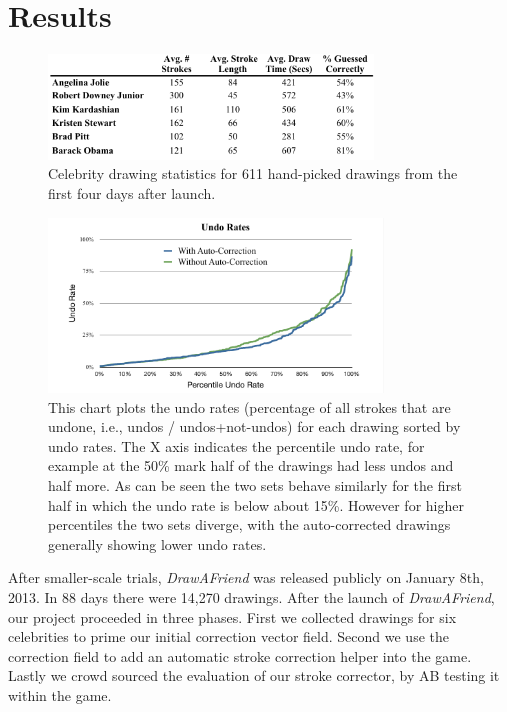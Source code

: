 \section{Results}
\begin{figure}
  \centering%
\includegraphics[height=1.1in]{./figures/daf-stats-cropped.pdf}
  \caption{Celebrity drawing statistics for 611 hand-picked drawings from the first four days after launch.}
  \label{fig:daf-stats}
\end{figure}


\begin{figure}[!t]
  \centering%
\includegraphics[width=3.5in]{./figures/userstudy/undoRates_chart_cropped.pdf}
  \caption{This chart plots the undo rates (percentage of all strokes that are undone, i.e., undos / undos+not-undos) for
each drawing sorted by undo rates. The X axis indicates the percentile undo rate, for example at the 50\% mark half of the
drawings had less undos and half more. As can be seen the two sets behave similarly for the first half in which the undo
rate is below about 15\%. However for higher percentiles the two sets diverge, with the auto-corrected drawings generally
showing lower undo rates.}
  \label{fig:daf-undos}
\end{figure}



After smaller-scale trials, \emph{DrawAFriend} was released publicly on January 8th, 2013. In 88 days there were 14,270 drawings. After the launch of \emph{DrawAFriend}, our project proceeded in three phases. First we collected drawings for six celebrities to prime our initial correction vector field. Second we use the correction field to add an automatic stroke correction helper into the game. Lastly we crowd sourced the evaluation of our stroke corrector, by AB testing it within the game.

